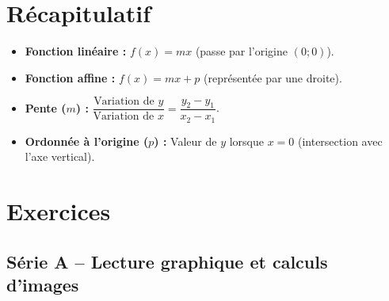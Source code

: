 \documentclass[../main.tex]{subfiles}
\begin{document}
\section{Récapitulatif}

\begin{tcolorbox}[colback=gray!6,colframe=gray!60!black,title={\bfseries À retenir}]
\begin{itemize}
  \item \textbf{Fonction linéaire :} $f(x) = mx$ (passe par l'origine $(0;0)$).
  \item \textbf{Fonction affine :} $f(x) = mx + p$ (représentée par une droite).
  \item \textbf{Pente ($m$) :} $\dfrac{\text{Variation de } y}{\text{Variation de } x} = \dfrac{y_2 - y_1}{x_2 - x_1}$.
  \item \textbf{Ordonnée à l'origine ($p$) :} Valeur de $y$ lorsque $x = 0$ (intersection avec l'axe vertical).
\end{itemize}
\end{tcolorbox}

\newpage
\section{Exercices}

\subsection{Série A -- Lecture graphique et calculs d'images}
\end{document}
